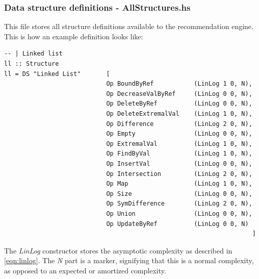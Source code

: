 \documentclass[a4paper,11pt]{article}
\begin{document}
\begin{appendices}
		\subsubsection{Data structure definitions - AllStructures.hs} \label{sec:all-structures-impl}
		This file stores all structure definitions available to the recommendation engine. 
		This is how an example definition looks like:
\begin{verbatim}
-- | Linked list
ll :: Structure
ll = DS "Linked List"       [
                            Op BoundByRef           (LinLog 1 0, N),
                            Op DecreaseValByRef     (LinLog 0 0, N),
                            Op DeleteByRef          (LinLog 0 0, N),
                            Op DeleteExtremalVal    (LinLog 1 0, N),
                            Op Difference           (LinLog 2 0, N),
                            Op Empty                (LinLog 0 0, N),
                            Op ExtremalVal          (LinLog 1 0, N),
                            Op FindByVal            (LinLog 1 0, N),
                            Op InsertVal            (LinLog 0 0, N),
                            Op Intersection         (LinLog 2 0, N),
                            Op Map                  (LinLog 1 0, N),
                            Op Size                 (LinLog 0 0, N),
                            Op SymDifference        (LinLog 2 0, N),
                            Op Union                (LinLog 0 0, N),
                            Op UpdateByRef          (LinLog 0 0, N)
                                                                    ]
\end{verbatim}
		The \emph{LinLog} constructor stores the asymptotic complexity as described in 
		\autoref{eqn:linlog}. The \emph{N} part is a marker, signifying that this is a normal complexity,
		as opposed to an expected or amortized complexity.
		

\end{appendices}
\end{document}

